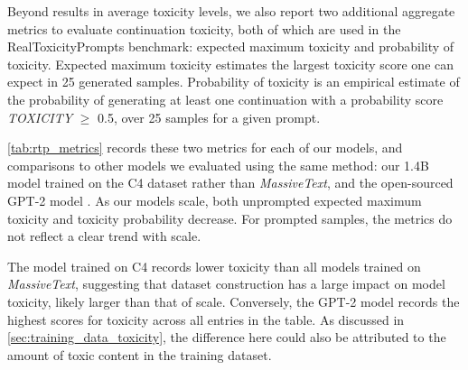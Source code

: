 \documentclass[11pt, a4paper, logo, internal, copyright, nonumbering]{deepmind}
\newcommand{\massivetext}{\textit{MassiveText}\xspace}
\begin{document}
Beyond results in average toxicity levels, we also report two additional aggregate metrics to evaluate continuation toxicity, both of which are used in the RealToxicityPrompts benchmark: expected maximum toxicity and probability of toxicity. Expected maximum toxicity estimates the largest toxicity score one can expect in 25 generated samples. Probability of toxicity is an empirical estimate of the probability of generating at least one continuation with a probability score \textit{TOXICITY} $\geq$ 0.5, over 25 samples for a given prompt.

\autoref{tab:rtp_metrics} records these two metrics for each of our models, and comparisons to other models we evaluated using the same method: our 1.4B model trained on the C4 dataset \citep{raffel2020exploring} rather than \massivetext, and the open-sourced GPT-2 model \citep{radford2019language}.
%
As our models scale, both unprompted expected maximum toxicity and toxicity probability decrease. For prompted samples, the metrics do not reflect a clear trend with scale.

The model trained on C4 records lower toxicity than all models trained on \massivetext, suggesting that dataset construction has a large impact on model toxicity, likely larger than that of scale. Conversely, the GPT-2 model records the highest scores for toxicity across all entries in the table. As discussed in \autoref{sec:training_data_toxicity}, the difference here could also be attributed to the amount of toxic content in the training dataset.
\end{document}
